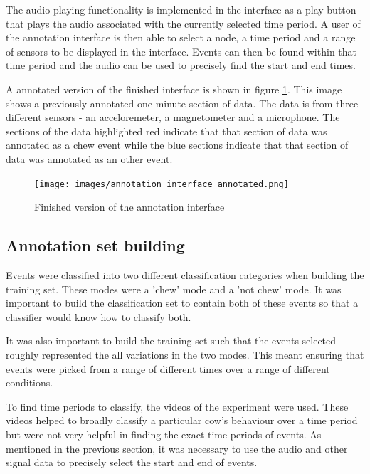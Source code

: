 The audio playing functionality is implemented in the interface as a play button that plays the audio associated with the currently selected time period. A user of the annotation interface is then able to select a node, a time period and a range of sensors to be displayed in the interface. Events can then be found within that time period and the audio can be used to precisely find the start and end times. 

A annotated version of the finished interface is shown in figure \ref{annotationinterface}. This image shows a previously annotated one minute section of data. The data is from three different sensors - an acceloremeter, a magnetometer and a microphone. The sections of the data highlighted red indicate that that section of data was annotated as a chew event while the blue sections indicate that that section of data was annotated as an other event. 

\begin{figure}[ht!]
\begin{center}
\leavevmode
\texttt{[image: images/annotation\_interface\_annotated.png]}
\end{center}
\caption{Finished version of the annotation interface}
\label{annotationinterface}
\end{figure}

\subsection{Annotation set building}

Events were classified into two different classification categories when building the training set. These modes were a 'chew' mode and a 'not chew' mode. It was important to build the classification set to contain both of these events so that a classifier would know how to classify both. 

It was also important to build the training set such that the events selected roughly represented the all variations in the two modes. This meant ensuring that events were picked from a range of different times over a range of different conditions.

To find time periods to classify, the videos of the experiment were used. These videos helped to broadly classify a particular cow's behaviour over a time period but were not very helpful in finding the exact time periods of events. As mentioned in the previous section, it was necessary to use the audio and other signal data to precisely select the start and end of events. 

